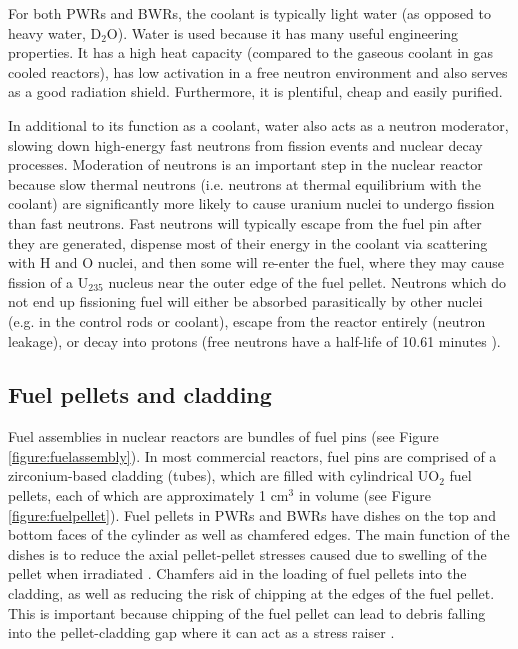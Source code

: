 For both PWRs and BWRs, the coolant is typically light water (as opposed to heavy water, D$_{2}$O). Water is used because it has many useful engineering properties. It has a high heat capacity (compared to the gaseous coolant in gas cooled reactors), has low activation in a free neutron environment and also serves as a good radiation shield. Furthermore, it is plentiful, cheap and easily purified.

In additional to its function as a coolant, water also acts as a neutron moderator, slowing down high-energy fast neutrons from fission events and nuclear decay processes. Moderation of neutrons is an important step in the nuclear reactor because slow thermal neutrons (i.e. neutrons at thermal equilibrium with the coolant) are significantly more likely to cause uranium nuclei to undergo fission than fast neutrons. Fast neutrons will typically escape from the fuel pin after they are generated, dispense most of their energy in the coolant via scattering with H and O nuclei, and then some will re-enter the fuel, where they may cause fission of a U$_{235}$ nucleus near the outer edge of the fuel pellet. Neutrons which do not end up fissioning fuel will either be absorbed parasitically by other nuclei (e.g. in the control rods or coolant), escape from the reactor entirely (neutron leakage), or decay into protons (free neutrons have a half-life of 10.61 minutes \cite{Christensen1972}).

\subsection{Fuel pellets and cladding} \label{ss_fuelpin}

Fuel assemblies in nuclear reactors are bundles of fuel pins (see Figure \ref{figure:fuelassembly}). In most commercial reactors, fuel pins are comprised of a zirconium-based cladding (tubes), which are filled with cylindrical UO$_{2}$ fuel pellets, each of which are approximately 1 cm$^{3}$ in volume (see Figure \ref{figure:fuelpellet}). Fuel pellets in PWRs and BWRs have dishes on the top and bottom faces of the cylinder as well as chamfered edges. The main function of the dishes is  to reduce the axial pellet-pellet stresses caused due to swelling of the pellet when irradiated \cite{marino2005crack}. Chamfers aid in the loading of fuel pellets into the cladding, as well as reducing the risk of chipping at the edges of the fuel pellet. This is important because chipping of the fuel pellet can lead to debris falling into the pellet-cladding gap where it can act as a stress raiser \cite{doerr2015nuclear}.

